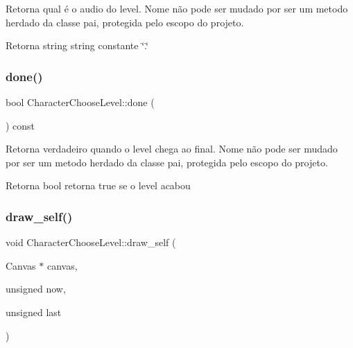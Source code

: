 Retorna qual é o audio do level. Nome não pode ser mudado por ser um metodo herdado da classe pai, protegida pelo escopo do projeto. 

\begin{DoxyReturn}{Retorna}
string string constante \char`\"{}.\char`\"{} 
\end{DoxyReturn}
\mbox{\label{classCharacterChooseLevel_a61050bcd8df73c5a1c941e2d3af6d384}} 
\subsubsection{\texorpdfstring{done()}{done()}}
{\footnotesize\ttfamily bool Character\+Choose\+Level\+::done (\begin{DoxyParamCaption}{ }\end{DoxyParamCaption}) const}



Retorna verdadeiro quando o level chega ao final. Nome não pode ser mudado por ser um metodo herdado da classe pai, protegida pelo escopo do projeto. 

\begin{DoxyReturn}{Retorna}
bool retorna \textquotesingle{}true\textquotesingle{} se o level acabou 
\end{DoxyReturn}
\mbox{\label{classCharacterChooseLevel_ac124d3fb4690e5b369a95f49758592ca}} 
\subsubsection{\texorpdfstring{draw\+\_\+self()}{draw\_self()}}
{\footnotesize\ttfamily void Character\+Choose\+Level\+::draw\+\_\+self (\begin{DoxyParamCaption}\item[{Canvas $\ast$}]{canvas,  }\item[{unsigned}]{now,  }\item[{unsigned}]{last }\end{DoxyParamCaption})\hspace{0.3cm}{\ttfamily [protected]}}



